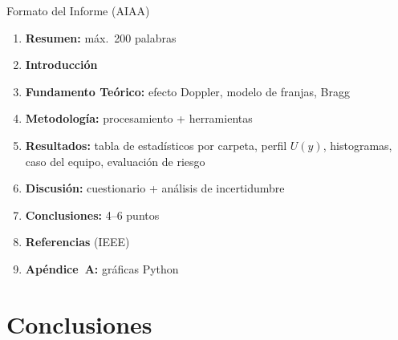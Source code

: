 \documentclass[aspectratio=169,12pt]{beamer}
\begin{document}
\begin{frame}{Formato del Informe (AIAA)}
	\begin{enumerate}
		\item \textbf{Resumen:} máx.\ 200 palabras
		\item \textbf{Introducción}
		\item \textbf{Fundamento Teórico:} efecto Doppler, modelo
		      de franjas, Bragg
		\item \textbf{Metodología:} procesamiento + herramientas
		\item \textbf{Resultados:} tabla de estadísticos por carpeta,
		      perfil $U(y)$, histogramas, caso del equipo,
		      evaluación de riesgo
		\item \textbf{Discusión:} cuestionario + análisis de
		      incertidumbre
		\item \textbf{Conclusiones:} 4--6 puntos
		\item \textbf{Referencias} (IEEE)
		\item \textbf{Apéndice~A:} gráficas Python
	\end{enumerate}
\end{frame}

\section{Conclusiones}
\end{document}
